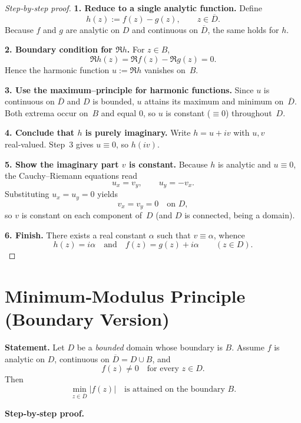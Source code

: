 \documentclass[12pt]{article}
\theoremstyle{definition} %
\theoremstyle{plain} %
\begin{document}
  \begin{proof}[Step‑by‑step proof]
  \textbf{1.  Reduce to a single analytic function.}  
  Define
  \[
     h(z):=f(z)-g(z),\qquad z\in\overline{D}.
  \]
  Because $f$ and $g$ are analytic on $D$ and continuous on $\overline{D}$,
  the same holds for $h$.
  
  \medskip
  \textbf{2.  Boundary condition for $\Re h$.}  
  For $z\in B$,
  \[
     \Re h(z)=\Re f(z)-\Re g(z)=0.
  \]
  Hence the harmonic function $u:=\Re h$ vanishes on~$B$.
  
  \medskip
  \textbf{3.  Use the maximum–principle for harmonic functions.}  
  Since $u$ is continuous on $\overline{D}$ and $D$ is bounded,
  $u$ attains its maximum and minimum on~$\overline{D}$.
  Both extrema occur on~$B$ and equal $0$,
  so $u$ is constant ($\equiv0$) throughout~$D$.
  
  \medskip
  \textbf{4.  Conclude that $h$ is purely imaginary.}  
  Write $h=u+iv$ with $u,v$ real‑valued.
  Step~3 gives $u\equiv0$, so $h(iv)$.
  
  \medskip
  \textbf{5.  Show the imaginary part $v$ is constant.}  
  Because $h$ is analytic and $u\equiv0$, the Cauchy–Riemann equations read
  \[
     u_x = v_y,\qquad u_y = -v_x.
  \]
  Substituting $u_x=u_y=0$ yields
  \[
     v_x=v_y=0\quad\text{on }D,
  \]
  so $v$ is constant on each component of~$D$
  (and $D$ is connected, being a domain).
  
  \medskip
  \textbf{6.  Finish.}  
  There exists a real constant $\alpha$ such that $v\equiv\alpha$,
  whence
  \[
      h(z)=i\alpha\quad\text{and}\quad f(z)=g(z)+i\alpha\qquad(z\in D).
  \]
  \end{proof}

  \section*{Minimum‐Modulus Principle (Boundary Version)}

\textbf{Statement.}
Let $D$ be a \emph{bounded} domain whose boundary is $B$.  
Assume $f$ is analytic on $D$, continuous on $\overline{D}=D\cup B$, and
\[
   f(z)\neq 0\quad\text{for every }z\in D .
\]
Then
\[
   \min_{z\in\overline{D}} |f(z)|
   \quad\text{is attained on the boundary } B .
   \tag{$\star$}
\]

\bigskip
\textbf{Step‑by‑step proof.}
\end{document}
